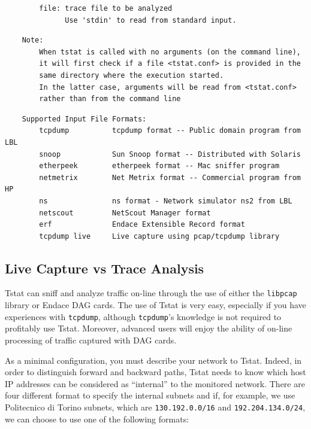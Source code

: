 \documentclass[11pt]{article}
\begin{document}
\begin{small}\begin{verbatim}
        file: trace file to be analyzed
              Use 'stdin' to read from standard input.
\end{verbatim}\end{small} \noindent
\begin{small}\begin{verbatim}
    Note:
        When tstat is called with no arguments (on the command line),
        it will first check if a file <tstat.conf> is provided in the
        same directory where the execution started.
        In the latter case, arguments will be read from <tstat.conf>
        rather than from the command line
\end{verbatim}\end{small} \noindent
\begin{small}\begin{verbatim}
    Supported Input File Formats:
        tcpdump          tcpdump format -- Public domain program from LBL
        snoop            Sun Snoop format -- Distributed with Solaris
        etherpeek        etherpeek format -- Mac sniffer program
        netmetrix        Net Metrix format -- Commercial program from HP
        ns               ns format - Network simulator ns2 from LBL
        netscout         NetScout Manager format
        erf              Endace Extensible Record format
        tcpdump live     Live capture using pcap/tcpdump library
\end{verbatim}\end{small} \noindent
\subsection{Live Capture vs Trace Analysis\label{Live_Capture_vs_Trace_Analysis}}


Tstat can sniff and analyze traffic on-line through the
use of either the \texttt{libpcap} library or Endace DAG cards. 
The use of Tstat is very easy, especially if you have
experiences with \texttt{tcpdump}, although \texttt{tcpdump}'s knowledge
is not required to profitably use Tstat. Moreover, advanced 
users will enjoy the ability of on-line processing of traffic
captured with DAG cards.



As a minimal configuration, you must describe your network to Tstat. Indeed, in
order to distinguish forward and backward paths, Tstat needs to know which host
IP addresses can be considered as ``internal'' to the monitored network. 
There are four different format to specify the internal subnets and
if, for example, we use Politecnico di Torino subnets, which are \texttt{130.192.0.0/16} and
\texttt{192.204.134.0/24}, we can choose to use one of the following formats:
\end{document}
